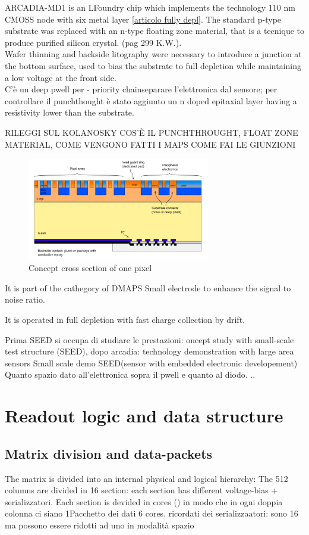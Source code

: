 

ARCADIA-MD1 is an LFoundry chip which implements the technology 110 nm CMOSS node
with six metal layer \ref{articolo fully depl}.
The standard p-type substrate was replaced with an n-type floating zone material,
that is a tecnique to produce purified silicon crystal. (pag 299 K.W.).\\

Wafer thinning and backside litography were necessary to introduce a junction
at the bottom surface, used to bias the substrate to full depletion while
maintaining a low voltage at the front side.  \\
C'è un deep pwell per - priority chainseparare l'elettronica dal sensore; per controllare il punchthought
è stato aggiunto un n doped epitaxial layer having a resistivity lower than the substrate.

RILEGGI SUL KOLANOSKY COS'È IL PUNCHTHROUGHT, FLOAT ZONE MATERIAL, COME VENGONO FATTI I MAPS
COME FAI LE GIUNZIONI

\begin{figure}
\centering\includegraphics[width=8cm]{figures/pixel_scheme.png}
\caption{Concept cross section of one pixel}
\label{fig:pixel_scheme}
\end{figure}

It is part of the cathegory of DMAPS
Small electrode to enhance the signal to noise ratio.

It is operated in full depletion with fast charge collection by drift.

Prima SEED si occupa di studiare le prestazioni: oncept study with small-scale test structure (SEED),
dopo arcadia: technology demonstration with large area sensors
Small scale demo SEED(sensor with embedded electronic developement)
Quanto spazio dato all'elettronica sopra il pwell e quanto al diodo. ..

\section{Readout logic and data structure}
\subsection{Matrix division and data-packets}
The matrix is divided into an internal physical and logical hierarchy:
The 512 columns are divided in 16 section: each section has different voltage-bias + serializzatori.
Each section is devided in cores () in modo che in ogni doppia colonna ci siano 1Pacchetto dei dati
6 cores. ricordati dei serializzaatori: sono 16 ma possono essere ridotti ad uno in modalità spazio


